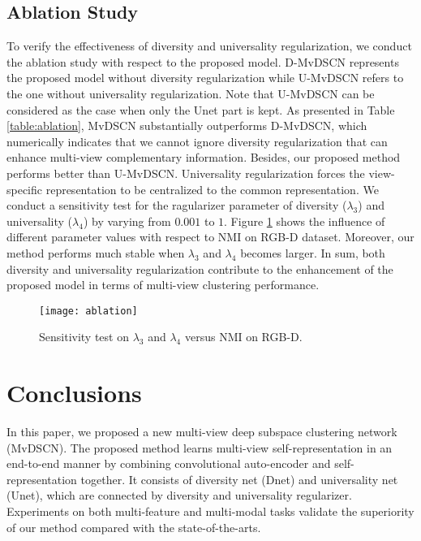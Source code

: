 \documentclass[journal]{IEEEtran}
\begin{document}
\subsection{Ablation Study}
To verify the effectiveness of diversity and universality regularization, we conduct the ablation study with respect to the proposed model.
D-MvDSCN represents the proposed model without diversity regularization while U-MvDSCN refers to the one without universality regularization.
Note that U-MvDSCN can be considered as the case when only the Unet part is kept. As presented in Table \ref{table:ablation}, MvDSCN substantially outperforms D-MvDSCN, which numerically indicates that we cannot ignore diversity regularization that can enhance multi-view complementary information. Besides, our proposed method performs better than U-MvDSCN.
Universality regularization forces the view-specific representation to be centralized to the common representation.
We conduct a sensitivity test for the ragularizer parameter of diversity ($\lambda_3$) and universality ($\lambda_4$) by varying from $0.001$ to $1$.
Figure \ref{fig:ablation} shows the influence of different parameter values with respect to NMI on RGB-D dataset.
Moreover, our method performs much stable when $\lambda_3$ and $\lambda_4$ becomes larger.
In sum, both diversity and universality regularization contribute to the enhancement of the proposed model in terms of multi-view clustering performance.

\begin{figure}[!htbp]
	\centering
	\texttt{[image: ablation]}
	\caption{Sensitivity test on $\lambda_3$ and $\lambda_4$ versus NMI on RGB-D.}
	\label{fig:ablation}
\end{figure}

\section{Conclusions}
\label{s5}
In this paper, we proposed a new multi-view deep subspace clustering network (MvDSCN).
The proposed method learns multi-view self-representation in an end-to-end manner by combining convolutional auto-encoder and self-representation together.
It consists of diversity net (Dnet) and universality net (Unet), which are connected by diversity and universality regularizer.
Experiments on both multi-feature and multi-modal tasks validate the superiority of our method compared with the state-of-the-arts.



\end{document}

